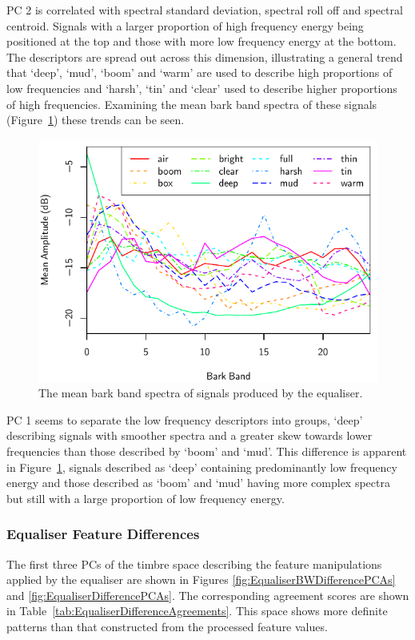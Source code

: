 			PC 2 is correlated with spectral standard deviation, spectral roll off and spectral centroid.
			Signals with a larger proportion of high frequency energy being positioned at the top and those
			with more low frequency energy at the bottom. The descriptors are spread out across this dimension,
			illustrating a general trend that `deep', `mud', `boom' and `warm' are used to describe high
			proportions of low frequencies and `harsh', `tin' and `clear' used to describe higher proportions
			of high frequencies. Examining the mean bark band spectra of these signals
			(Figure~\ref{fig:EqualiserProcessedSpectra}) these trends can be seen. 

			\begin{figure}[h!]
				\centering
				\includegraphics{chapter4/Images/EqualiserProcessedSpectra.pdf}
				\caption{The mean bark band spectra of signals produced by the equaliser.}
				\label{fig:EqualiserProcessedSpectra}
			\end{figure}

			PC 1 seems to separate the low frequency descriptors into groups, `deep' describing signals with
			smoother spectra and a greater skew towards lower frequencies than those described by `boom' and
			`mud'. This difference is apparent in Figure~\ref{fig:EqualiserProcessedSpectra}, signals described
			as `deep' containing predominantly low frequency energy and those described as `boom' and `mud'
			having more complex spectra but still with a large proportion of low frequency energy.

		\subsubsection*{Equaliser Feature Differences}
			The first three PCs of the timbre space describing the feature manipulations applied by the
			equaliser are shown in Figures \ref{fig:EqualiserBWDifferencePCAs} and
			\ref{fig:EqualiserDifferencePCAs}. The corresponding agreement scores are shown in
			Table~\ref{tab:EqualiserDifferenceAgreements}. This space shows more definite patterns than that
			constructed from the processed feature values.

